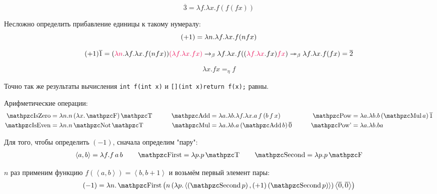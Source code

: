 \begin{example}
\[
    \overline{3} = \lambda f . \lambda x . f (f (f x))
\]
\end{example}

Несложно определить прибавление единицы к такому нумералу:
\[
    (+1) = \lambda{}n.\lambda{}f.\lambda{}x.f(nfx) \\
\]
\begin{example}
    \[
        (+1) \overline{1} =
        (\reduction{\lambda n} . \lambda f . \lambda x . f (n f x)) \reduction{(\lambda f . \lambda x . f x)} \rightarrow_{\beta}
        \lambda f . \lambda x . f ((\reduction{\lambda f . \lambda x} . f x) \reduction{f x}) \twoheadrightarrow_{\beta}
        \lambda f . \lambda x . f (f x) =
        \overline{2}
    \]
\end{example}

\begin{definition}
    \[
        \lambda x . f x =_{\eta} f
    \]
\end{definition}
Точно так же результаты вычисления \texttt{int f(int x)} и \texttt{[](int x){return f(x);}} равны.

Арифметические операции:
\begin{align*}
    \comb{IsZero} &= \lambda{}n.n\mathinner{(\lambda{}x.\F)}\T &\qquad
    \comb{Add}    &= \lambda{}a.\lambda{}b.\lambda{}f.\lambda{}x.a \mathinner{f} (b \mathinner{f} x) &\qquad
    \comb{Pow}    &= \lambda{}a.\lambda{}b.b \mathinner{(\comb{Mul} a)} \mathinner{\overline{1}} \\
    \comb{IsEven} &= \lambda{}n.n \Not \T &\qquad
    \comb{Mul}    &= \lambda{}a.\lambda{}b.a \mathinner{(\comb{Add} b)} \mathinner{\overline{0}} &\qquad
    \comb{Pow'}   &= \lambda{}a.\lambda{}b.b a
\end{align*}

Для того, чтобы определить $(-1)$, сначала определим "пару":
\begin{align*}
    \left<a,b\right> = \lambda f.f \mathinner{a} b \qquad
    \comb{First} = \lambda p . p \T \qquad
    \comb{Second} = \lambda p . p \F
\end{align*}

$n$ раз применим функцию $f\left(\left<a,b\right>\right) = \left<b,b+1\right>$ и возьмём первый элемент пары:
\[
    (-1) = \lambda n . \comb{First}
        \left(n \mathinner{(\lambda p . \left<\left(\comb{Second} p\right), \mathinner{(+1)} (\comb{Second} p)\right>)}
        \left<\overline{0},\overline{0}\right>\right)
\]

